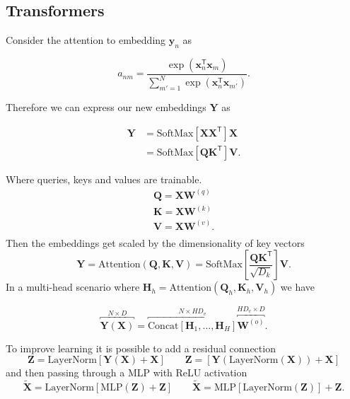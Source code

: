 \documentclass[a4paper,9pt]{extarticle}
\begin{document}
\begin{multicols*}{2}
		\section{Transformers}
		Consider the attention to embedding $\mathbf{y}_{n}$ as
		\begin{riquadro}
			\begin{equation*}
				a_{nm}=\frac{\exp(\mathbf{x}_{n}^{\mathsf{T}}\mathbf{x}_{m})}{\sum_{m'=1}^{N}\exp(\mathbf{x}_{n}^{\mathsf{T}}\mathbf{x}_{m'})}.
			\end{equation*}
		\end{riquadro}
		Therefore we can express our new embeddings $\mathbf{Y}$ as
		\begin{riquadro}
			\begin{align*}
				\mathbf{Y}&=\text{SoftMax}\left[\mathbf{X}\mathbf{X}^{\mathsf{T}}\right]\mathbf{X}\\
				&=\text{SoftMax}\left[\mathbf{Q}\mathbf{K}^{\mathsf{T}}\right]\mathbf{V}.
			\end{align*}
		\end{riquadro}
		Where queries, keys and values are trainable.
		\begin{equation*}
			\begin{array}{c}
				\mathbf{Q}=\mathbf{X}\mathbf{W}^{(q)}\\
					\mathbf{K}=\mathbf{X}\mathbf{W}^{(k)}\\
						\mathbf{V}=\mathbf{X}\mathbf{W}^{(v)}.\\
			\end{array}
		\end{equation*}
		Then the embeddings get scaled by the dimensionality of key vectors
		\begin{equation*}
			\mathbf{Y}=\text{Attention}(\mathbf{Q},\mathbf{K},\mathbf{V})=\text{SoftMax}\left[\frac{\mathbf{Q}\mathbf{K}^{\mathsf{T}}}{\sqrt{D_{k}}}\right]\mathbf{V}.
		\end{equation*}
		In a multi-head scenario where $\mathbf{H}_{h}=\text{Attention}(\mathbf{Q}_{h},\mathbf{K}_{h},\mathbf{V}_{h})$ we have
		\begin{riquadro}
			\begin{equation*}
				\overbracket{\mathbf{Y}(\mathbf{X})}^{N\times D}=\overbracket{\text{Concat}[\mathbf{H}_{1},\ldots,\mathbf{H}_{H}]}^{N\times HD_{v}}\overbracket{\mathbf{W}^{(o)}}^{{HD_{v}\times D}}.
			\end{equation*}
		\end{riquadro}
		To improve learning it is possible to add a residual connection 
		\begin{equation*}
			\mathbf{Z}=\text{LayerNorm}[\mathbf{Y}(\mathbf{X})+\mathbf{X}]\qquad	\mathbf{Z}=[\mathbf{Y}(\text{LayerNorm}(\mathbf{X}))+\mathbf{X}]
		\end{equation*}
		and then passing through a MLP with ReLU activation
		\begin{equation*}
			\widetilde{\mathbf{X}}=\text{LayerNorm}[\text{MLP}(\mathbf{Z})+\mathbf{Z}]\qquad\widetilde{\mathbf{X}}=\text{MLP}[\text{LayerNorm}(\mathbf{Z})]+\mathbf{Z}.
		\end{equation*}

\end{multicols*}
\end{document}
